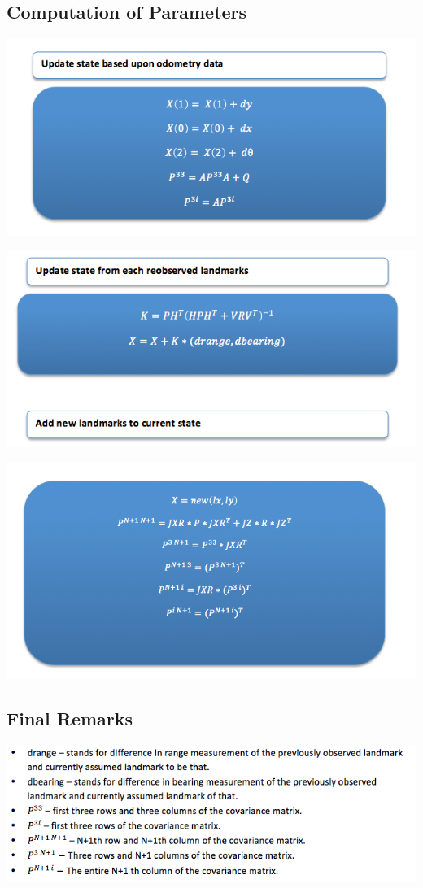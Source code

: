 \documentclass[12pt]{article}
\begin{document}
\subsection{Computation of Parameters}
\begin{center} \includegraphics[scale=0.4]{p1} \end{center}
\begin{center} \includegraphics[scale=0.4]{p2} \end{center}
\begin{center} \includegraphics[scale=0.4]{p3} \end{center}
\subsection{Final Remarks}
\begin{center} \includegraphics[scale=0.4]{p4} \end{center}
\end{document}
